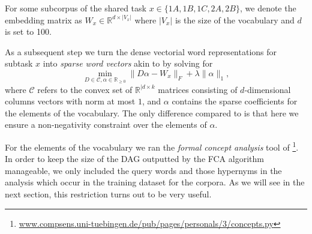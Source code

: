 \documentclass[11pt,a4paper]{article}
\begin{document}
For some subcorpus of the shared task $x\in\{1A, 1B, 1C, 2A, 2B\}$, we denote
the embedding matrix as $W_x \in \mathbb{R}^{d \times \lvert V_x \rvert}$ where
$\lvert V_x \rvert$ is the size of the vocabulary and $d$ is set to 100.

As a subsequent step we turn the dense vectorial word representations for subtask $x$ into
\emph{sparse word vectors} akin to \citet{Berend:2017} by solving for
\begin{equation}
\min\limits_{D \in \mathcal{C}, \alpha \in \mathbb{R}_{\geq0}} \lVert D\alpha - W_{x} \rVert_F + \lambda \lVert \alpha \rVert_1,
\label{nonneg_SPAMS_objective}
\end{equation}
where $\mathcal{C}$ refers to the convex set of $\mathbb{R}^{\lvert d \times k}$ matrices consisting of $d$-dimensional columns vectors
with norm at most $1$, and $\alpha$ contains the sparse coefficients for the elements of the vocabulary. The only difference
compared to \citet{Berend:2017} is that here we ensure a non-negativity
constraint over the elements of $\alpha$.

For the elements of the vocabulary we ran the \emph{formal concept analysis} tool of
\citet{Endres:2010}\footnote{\url{www.compsens.uni-tuebingen.de/pub/pages/personals/3/concepts.py}}.
In order to keep the size of the DAG outputted by the FCA algorithm manageable,
we only included the query words and those hypernyms in the analysis which
occur in the training dataset for the corpora.
As we will see in the next section, this restriction turns out to be very useful.

\end{document}
